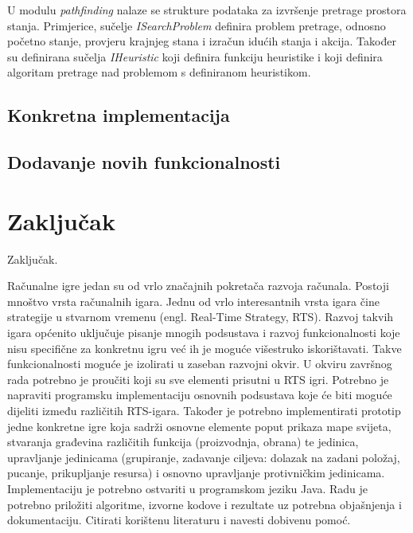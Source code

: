 \documentclass[times, utf8, zavrsni, numeric]{fer}
\begin{document}
\par U modulu \textit{pathfinding} nalaze se strukture podataka za izvršenje pretrage prostora stanja.
Primjerice, sučelje \textit{ISearchProblem} definira problem pretrage, odnosno početno stanje, provjeru krajnjeg stana i izračun idućih stanja i akcija. 
Također su definirana sučelja \textit{IHeuristic} koji definira funkciju heuristike i  koji definira algoritam pretrage nad problemom s definiranom heuristikom.

\section{Konkretna implementacija}

\section{Dodavanje novih funkcionalnosti}

\chapter{Zaključak}\label{ch:conclusion}
Zaključak.




\begin{sazetak}
Računalne igre jedan su od vrlo značajnih pokretača razvoja računala. Postoji mnoštvo vrsta računalnih igara. 
Jednu od vrlo interesantnih vrsta igara čine strategije u stvarnom vremenu (engl. Real-Time Strategy, RTS). 
Razvoj takvih igara općenito uključuje pisanje mnogih podsustava i razvoj funkcionalnosti koje nisu specifične za konkretnu igru već ih je moguće višestruko iskorištavati. 
Takve funkcionalnosti moguće je izolirati u zaseban razvojni okvir. U okviru završnog rada potrebno je proučiti koji su sve elementi prisutni u RTS igri. 
Potrebno je napraviti programsku implementaciju osnovnih podsustava koje će biti moguće dijeliti između različitih RTS-igara. 
Također je potrebno implementirati prototip jedne konkretne igre koja sadrži osnovne elemente poput prikaza mape svijeta, stvaranja građevina različitih funkcija (proizvodnja, obrana) te jedinica, upravljanje jedinicama (grupiranje, zadavanje ciljeva: dolazak na zadani položaj, pucanje, prikupljanje resursa) i osnovno upravljanje protivničkim jedinicama. 
Implementaciju je potrebno ostvariti u programskom jeziku Java. 
Radu je potrebno priložiti algoritme, izvorne kodove i rezultate uz potrebna objašnjenja i dokumentaciju. 
Citirati korištenu literaturu i navesti dobivenu pomoć.

\end{sazetak}
\end{document}
